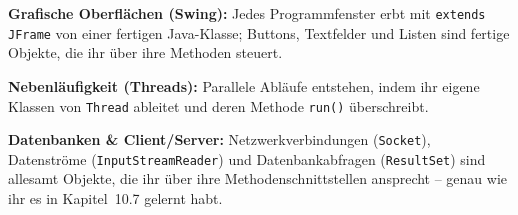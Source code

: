\begin{compactitem}
  \item \textbf{Grafische Oberflächen (Swing):} Jedes Programmfenster erbt mit
  \lstinline|extends JFrame| von einer fertigen Java-Klasse; Buttons,
  Textfelder und Listen sind fertige Objekte, die ihr über ihre Methoden
  steuert.
  \item \textbf{Nebenläufigkeit (Threads):} Parallele Abläufe entstehen, indem
  ihr eigene Klassen von \lstinline|Thread| ableitet und deren Methode
  \lstinline|run()| überschreibt.
  \item \textbf{Datenbanken \& Client/Server:} Netzwerkverbindungen
  (\lstinline|Socket|), Datenströme (\lstinline|InputStreamReader|) und
  Datenbankabfragen (\lstinline|ResultSet|) sind allesamt Objekte, die ihr über
  ihre Methodenschnittstellen ansprecht -- genau wie ihr es in Kapitel~10.7
  gelernt habt.
\end{compactitem}

